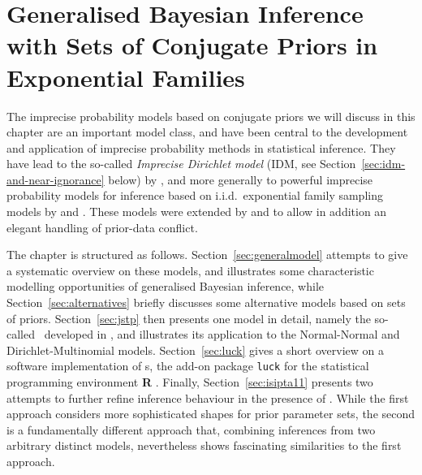 \chapter{Generalised Bayesian Inference with Sets of Conjugate Priors in Exponential Families}
\label{cha:imprecisebayes-conjugate}

The imprecise probability models based on conjugate priors we will discuss in this chapter
are an important model class,
and have been central to the development and application of imprecise probability methods
in statistical inference.
They have lead to the so-called \emph{Imprecise Dirichlet model} (IDM, see Section~\ref{sec:idm-and-near-ignorance} below)
by \textcite{1996:walley::idm}, %
and more generally to powerful imprecise probability models for inference
based on i.i.d.\ exponential family sampling models by \textcite{2005:quaeghebeurcooman} and \textcite{2009:quaeghebeur::phd}.
These models were extended by \textcite[see Section~\ref{sec:jstp}]{Walter2009a} and \textcite[see Section~\ref{sec:isipta11}]{Walter2011a}
to allow in addition an elegant handling of prior-data conflict.

\medskip

The chapter is structured as follows.
Section~\ref{sec:generalmodel} attempts to give a systematic overview on these models, %
and illustrates some characteristic modelling opportunities of generalised Bayesian inference, while
Section~\ref{sec:alternatives} briefly discusses some alternative models based on sets of priors.
Section~\ref{sec:jstp} then presents one model in detail, namely the so-called
\nymodel\ developed in \textcite{Walter2009a},
and illustrates its application to the Normal-Normal and Dirichlet-Multinomial models. %
Section~\ref{sec:luck} gives a short overview on a software implementation of \nymodel s,
the add-on package \texttt{luck} \parencite{luck-package} for the statistical programming environment \textbf{R} \parencite{2013:r}.
Finally,
Section~\ref{sec:isipta11} presents two attempts to further refine inference behaviour in the presence of \pdc.
While the first approach considers more sophisticated shapes for prior parameter sets,
the second is a fundamentally different approach that, combining inferences from two arbitrary distinct models,
nevertheless shows fascinating similarities to the first approach.


\newpage

